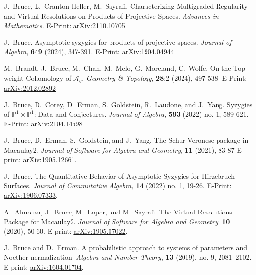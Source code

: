 \documentclass[letterpaper,11pt]{article}
\begin{document}
\begin{revnumerate}[20]
	
\item
	J.~Bruce, L.~Cranton Heller, M.~Sayrafi. Characterizing Multigraded Regularity and Virtual Resolutions on Products of Projective Spaces.  {\it Advances in Mathematics}. E-Print:  \hyperref{https://arxiv.org/abs/2110.10705}{}{}{arXiv:2110.10705}	

\item
	J.~Bruce. Asymptotic syzygies for products of projective spaces.  {\it Journal of Algebra}, \textbf{649} (2024),  347-391. E-Print:  \hyperref{https://arxiv.org/abs/1904.04944}{}{}{arXiv:1904.04944}

\item
	M.~Brandt, J.~Bruce, M.~Chan, M.~Melo, G.~Moreland, C.~Wolfe. On the Top-weight Cohomology of $\mathcal{A}_{g}$.  {\it Geometry \& Topology}, \textbf{28}:2 (2024), 497-538. E-Print:  \hyperref{https://arxiv.org/abs/2012.02892}{}{}{arXiv:2012.02892}
	
\item
	J.~Bruce, D.~Corey, D.~Erman, S.~Goldstein, R.~Laudone, and J.~Yang. Syzygies of $\mathbb{P}^{1}\times\mathbb{P}^{1}$: Data and Conjectures.  {\it Journal of Algebra}, \textbf{593} (2022) no. 1,  589-621. E-Print:  \hyperref{https://arxiv.org/abs/2104.14598}{}{}{arXiv:2104.14598}
	
\item
	J.~Bruce, D.~Erman, S.~Goldstein, and J.~Yang. The Schur-Veronese package in Macaulay2.  {\it Journal of Software for Algebra and Geometry}, \textbf{11} (2021), 83-87 E-print: \hyperref{https://arxiv.org/abs/1905.12661}{}{}{arXiv:1905.12661}.
	
\item
	J.~Bruce. The Quantitative Behavior of Asymptotic Syzygies for Hirzebruch Surfaces. {\it Journal of Commutative Algebra,} \textbf{14} (2022) no. 1, 19-26. E-Print:  \hyperref{http://arxiv.org/abs/1906.07333}{}{}{arXiv:1906.07333}.
	
\item
	A.~Almousa, J.~Bruce, M.~Loper, and M.~Sayrafi. The Virtual Resolutions Package for Macaulay2.  {\it Journal of Software for Algebra and Geometry}, \textbf{10} (2020), 50-60. E-print: \hyperref{http://arxiv.org/abs/1905.07022}{}{}{arXiv:1905.07022}.
	
\item
	J.~Bruce and D.~Erman. A probabilistic approach to systems of parameters and Noether normalization. {\it Algebra and Number Theory}, \textbf{13} (2019), no. 9, 2081–2102. E-print: \hyperref{http://arxiv.org/abs/1604.01704}{}{}{arXiv:1604.01704}.
	

\end{revnumerate}
\end{document}
